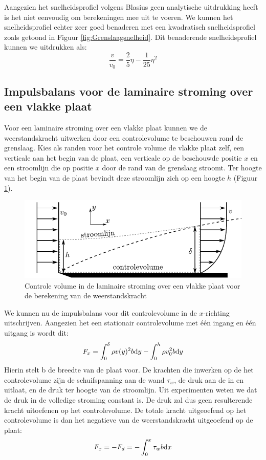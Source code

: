 Aangezien het snelheidsprofiel volgens Blasius geen analytische uitdrukking heeft is het niet eenvoudig om berekeningen mee uit te voeren. We kunnen het snelheidsprofiel echter zeer goed benaderen met een kwadratisch snelheidsprofiel zoals getoond in Figuur \ref{fig:Grenslaagsnelheid}. Dit benaderende snelheidsprofiel kunnen we uitdrukken als:
\begin{equation}
	\frac{v}{v_0} = \frac{2}{5}\eta - \frac{1}{25}\eta^2
\end{equation}

		\subsection{Impulsbalans voor de laminaire stroming over een vlakke plaat}
		\label{sec:Impulsbalans voor de laminaire stroming over een vlakke plaat}
Voor een laminaire stroming over een vlakke plaat kunnen we de weerstandskracht uitwerken door een controlevolume te beschouwen rond de grenslaag. Kies als randen voor het controle volume de vlakke plaat zelf, een verticale aan het begin van de plaat, een verticale op de beschouwde positie $x$ en een stroomlijn die op positie $x$ door de rand van de grenslaag stroomt. Ter hoogte van het begin van de plaat bevindt deze stroomlijn zich op een hoogte $h$ (Figuur \ref{fig:Laminaire_genslaag_controlevolume}).
\begin{figure}[htb]
	\centering
	\includegraphics{fig/uitwendige_stroming/Laminaire_grenslaag_controlevolume}
	\caption{Controle volume in de laminaire stroming over een vlakke plaat voor de berekening van de weerstandskracht}
	\label{fig:Laminaire_genslaag_controlevolume}
\end{figure}

We kunnen nu de impulsbalans voor dit controlevolume in de $x$-richting uitschrijven. Aangezien het een stationair controlevolume met één ingang en één uitgang is wordt dit:
\begin{equation}
	F_x = \int_0^{\delta} \rho v(y)^2 b \mathrm{d} y  - \int_0^{h} \rho v_0^2 b \mathrm{d} y
	\label{eqn:laminaire grenslaag impuls}
\end{equation}
Hierin stelt b de breedte van de plaat voor. De krachten die inwerken op de het controlevolume zijn de schuifspanning aan de wand $\tau_w$, de druk aan de in en uitlaat, en de druk ter hoogte van de stroomlijn. Uit experimenten weten we dat de druk in de volledige stroming constant is. De druk zal dus geen resulterende kracht uitoefenen op het controlevolume. De totale kracht uitgeoefend op het controlevolume is dan het negatieve van de weerstandskracht uitgeoefend op de plaat:
\begin{equation}
	F_x = -F_d = -\int_0^x \tau_w b \mathrm{d} x
\end{equation}

